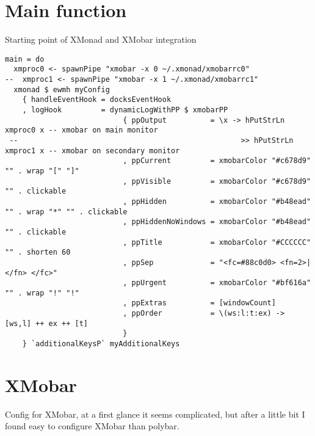 \documentclass[11pt]{article}
\begin{document}
\section{Main function}
\label{sec:org76147bf}
Starting point of XMonad and XMobar integration
\begin{verbatim}
main = do
  xmproc0 <- spawnPipe "xmobar -x 0 ~/.xmonad/xmobarrc0"
--  xmproc1 <- spawnPipe "xmobar -x 1 ~/.xmonad/xmobarrc1"
  xmonad $ ewmh myConfig
    { handleEventHook = docksEventHook
    , logHook         = dynamicLogWithPP $ xmobarPP
                           { ppOutput          = \x -> hPutStrLn xmproc0 x -- xmobar on main monitor
 --                                                   >> hPutStrLn xmproc1 x -- xmobar on secondary monitor
                           , ppCurrent         = xmobarColor "#c678d9" "" . wrap "[" "]"
                           , ppVisible         = xmobarColor "#c678d9" "" . clickable
                           , ppHidden          = xmobarColor "#b48ead" "" . wrap "*" "" . clickable
                           , ppHiddenNoWindows = xmobarColor "#b48ead" "" . clickable
                           , ppTitle           = xmobarColor "#CCCCCC" "" . shorten 60
                           , ppSep             = "<fc=#88c0d0> <fn=2>|</fn> </fc>"
                           , ppUrgent          = xmobarColor "#bf616a" "" . wrap "!" "!" 
                           , ppExtras          = [windowCount]
                           , ppOrder           = \(ws:l:t:ex) -> [ws,l] ++ ex ++ [t]
                           }
    } `additionalKeysP` myAdditionalKeys
\end{verbatim}
\section{XMobar}
\label{sec:org066dc3b}
Config for XMobar, at a first glance it seems complicated,
but after a little bit I found easy to configure XMobar than polybar.
\end{document}
